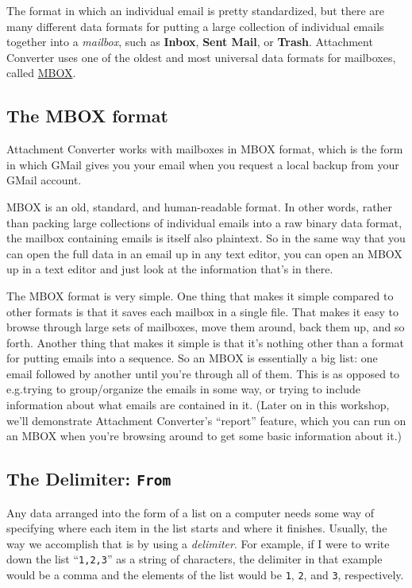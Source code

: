 \documentclass[11pt]{article}
\begin{document}
The format in which an individual email is pretty standardized, but
there are many different data formats for putting a large collection
of individual emails together into a \emph{mailbox}, such as \textbf{Inbox}, \textbf{Sent
Mail}, or \textbf{Trash}.  Attachment Converter uses one of the oldest and
most universal data formats for mailboxes, called \href{https://www.loc.gov/preservation/digital/formats/fdd/fdd000383.shtml}{MBOX}.  

\subsection{The MBOX format}
\label{sec:org544870e}

Attachment Converter works with mailboxes in MBOX format, which is the
form in which GMail gives you your email when you request a local
backup from your GMail account.

MBOX is an old, standard, and human-readable format.  In other words,
rather than packing large collections of individual emails into a raw
binary data format, the mailbox containing emails is itself also
plaintext.  So in the same way that you can open the full data in an
email up in any text editor, you can open an MBOX up in a text editor
and just look at the information that's in there.

The MBOX format is very simple.  One thing that makes it simple
compared to other formats is that it saves each mailbox in a single
file.  That makes it easy to browse through large sets of mailboxes,
move them around, back them up, and so forth.  Another thing that
makes it simple is that it's nothing other than a format for putting
emails into a sequence.  So an MBOX is essentially a big list: one
email followed by another until you're through all of them.  This is
as opposed to e.g.\@  trying to group/organize the emails in some way, or
trying to include information about what emails are contained in it.
(Later on in this workshop, we'll demonstrate Attachment Converter's
``report'' feature, which you can run on an MBOX when you're browsing
around to get some basic information about it.)

\subsection{The Delimiter: \texttt{From}}
\label{sec:orgb680865}

Any data arranged into the form of a list on a computer needs some way
of specifying where each item in the list starts and where it
finishes.  Usually, the way we accomplish that is by using a
\emph{delimiter}.  For example, if I were to write down the list ``\texttt{1,2,3}''
as a string of characters, the delimiter in that example would be a
comma and the elements of the list would be \texttt{1}, \texttt{2}, and \texttt{3},
respectively.
\end{document}
